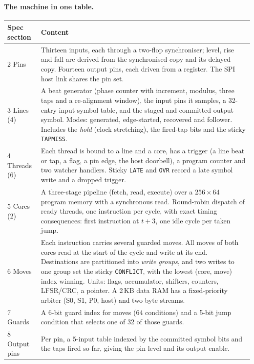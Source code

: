 \documentclass[11pt,a4paper]{article}
\newcommand{\brkus}{\textunderscore\allowbreak}
\newcommand{\code}[1]{{\let\_\brkus\texttt{#1}}}
\begin{document}
\paragraph{The machine in one table.}
\begin{table}[!ht]
\centering\small
\begin{tabularx}{\linewidth}{@{}l>{\raggedright\arraybackslash}X@{}}
\toprule
Spec section & Content \\
\midrule
2 Pins & Thirteen inputs, each through a two-flop synchroniser; level, rise and
  fall are derived from the synchronised copy and its delayed copy. Fourteen
  output pins, each driven from a register. The SPI host link shares the pin
  set. \\
3 Lines (4) & A beat generator (phase counter with increment, modulus, three
  taps and a re-alignment window), the input pins it samples, a 32-entry input
  symbol table, and the staged and committed output symbol. Modes: generated,
  edge-started, recovered and follower. Includes the \emph{hold} (clock
  stretching), the fired-tap bits and the sticky \code{TAPMISS}. \\
4 Threads (6) & Each thread is bound to a line and a core, has a trigger
  (a line beat or tap, a flag, a pin edge, the host doorbell), a program
  counter and two watcher handlers. Sticky \code{LATE} and \code{OVR} record a
  late symbol write and a dropped trigger. \\
5 Cores (2) & A three-stage pipeline (fetch, read, execute) over a
  $256\times64$ program memory with a synchronous read. Round-robin dispatch of
  ready threads, one instruction per cycle, with exact timing consequences:
  first instruction at $t+3$, one idle cycle per taken jump. \\
6 Moves & Each instruction carries several guarded moves. All moves of both
  cores read at the start of the cycle and write at its end. Destinations are
  partitioned into \emph{write groups}, and two writes to one group set the
  sticky \code{CONFLICT}, with the lowest (core, move) index winning. Units:
  flags, accumulator, shifters, counters, LFSR/CRC, a pointer. A 2\,KB data RAM
  has a fixed-priority arbiter (S0, S1, P0, host) and two byte streams. \\
7 Guards & A 6-bit guard index for moves (64 conditions) and a 5-bit jump condition
  that selects one of 32 of those guards. \\
8 Output pins & Per pin, a 5-input table indexed by the committed symbol bits and
  the taps fired so far, giving the pin level and its output enable. \\

\end{tabularx}
\end{table}
\end{document}
